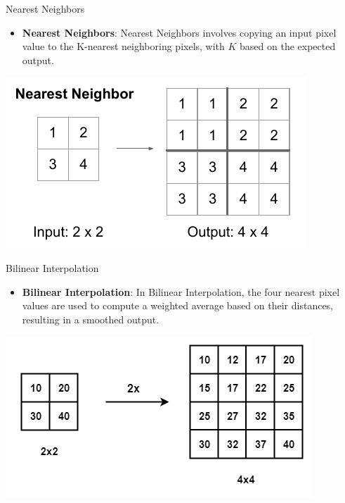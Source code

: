 \documentclass[default, aspectratio=169]{beamer}
\begin{document}
	\begin{frame}{Nearest Neighbors}
		\vspace{0.5cm}
		\begin{itemize}
			\item \textbf{Nearest Neighbors}: Nearest Neighbors involves copying an input pixel value to the K-nearest neighboring pixels, with $K$ based on the expected output.
		\end{itemize}
		
		\centering
		\includegraphics[keepaspectratio, scale=0.4]{pic/Upsamlpe_1.png}
	\end{frame}
	\begin{frame}{Bilinear Interpolation}
		\vspace{0.5cm}
		\begin{itemize}
			\item \textbf{Bilinear Interpolation}: In Bilinear Interpolation, the four nearest pixel values are used to compute a weighted average based on their distances, resulting in a smoothed output.
		\end{itemize}
		
		\centering
		\includegraphics[keepaspectratio, scale=0.4]{pic/Upsamlpe_2.png}
		
	\end{frame}
\end{document}
